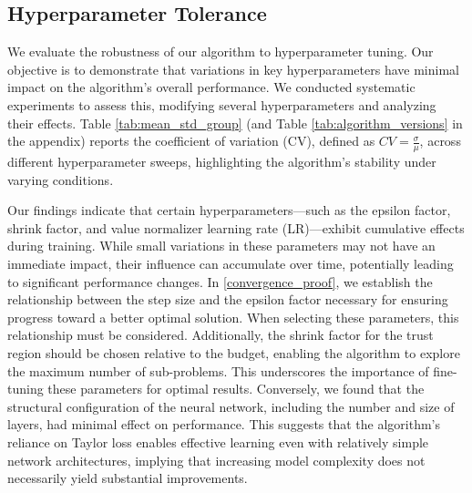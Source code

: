 \subsection{Hyperparameter Tolerance}
We evaluate the robustness of our algorithm to hyperparameter tuning. Our objective is to demonstrate that variations in key hyperparameters have minimal impact on the algorithm's overall performance. We conducted systematic experiments to assess this, modifying several hyperparameters and analyzing their effects. Table \ref{tab:mean_std_group} (and Table \ref{tab:algorithm_versions}
in the appendix) reports the coefficient of variation (CV), defined as $CV = \frac{\sigma}{\mu}$, across different hyperparameter sweeps, highlighting the algorithm's stability under varying conditions.

Our findings indicate that certain hyperparameters—such as the epsilon factor, shrink factor, and value normalizer learning rate (LR)—exhibit cumulative effects during training. While small variations in these parameters may not have an immediate impact, their influence can accumulate over time, potentially leading to significant performance changes. In \ref{convergence_proof}, we establish the relationship between the step size and the epsilon factor necessary for ensuring progress toward a better optimal solution. When selecting these parameters, this relationship must be considered. Additionally, the shrink factor for the trust region should be chosen relative to the budget, enabling the algorithm to explore the maximum number of sub-problems.
This underscores the importance of fine-tuning these parameters for optimal results. Conversely, we found that the structural configuration of the neural network, including the number and size of layers, had minimal effect on performance. This suggests that the algorithm's reliance on Taylor loss enables effective learning even with relatively simple network architectures, implying that increasing model complexity does not necessarily yield substantial improvements.

\begin{table*}[h!]
    \centering
    \scriptsize
    \caption{Coefficient of Variation ($CV=\frac{\sigma}{\mu}$) over a Hyperparameter sweep experiment.}
    \label{tab:mean_std_group}
\end{table*}

